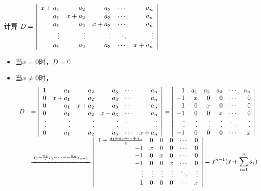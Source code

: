 \begin{frame}
  
    \begin{li}
      计算
      $
      D=\left|
      \begin{array}{rrrrr}
        x+a_1&a_2&a_3&\cdots&a_n\\
        a_1&x+a_2&a_3&\cdots&a_n\\
        a_1&a_2&x+a_3&\cdots&a_n\\
        \vdots&\vdots&\vdots&\ddots&\vdots\\
        a_1&a_2&a_3&\cdots&x+a_n
      \end{array}
      \right|
      $
    \end{li}
    

    \pause
    \begin{small}
    \begin{jie}[加边法]
    \begin{itemize}
    \item 当$x=0$时，$D=0$
    \item 当$x\ne 0$时，
      $$
    \begin{array}{rl}
            D&=\left|
      \begin{array}{rrrrrr}
        1&a_1&a_2&a_3&\cd&a_n\\
        0&x+a_1&a_2&a_3&\cd&a_n\\
        0&a_1&x+a_2&a_3&\cd&a_n\\
        0&a_1&a_2&x+a_3&\cd&a_n\\
        \vd&\vd&\vd&\vd&\dd&\vd\\
        0&a_1&a_2&a_3&\cd&x+a_n
      \end{array}      \right|=\left|
      \begin{array}{rrrrrr}
        1&a_1&a_2&a_3&\cd&a_n\\
        -1&x&0&0&\cd&0\\
        -1&0&x&0&\cd&0\\
        -1&0&0&x&\cd&0\\
        \vd&\vd&\vd&\vd&\dd&\vd\\
        -1&0&0&0&\cd&x
      \end{array}
      \right|\\[0.4in]
      &\xlongequal[]{r_1-\frac{a_1}xr_2-\cd--\frac{a_n}xr_{n+1}}
      \left|
      \begin{array}{rrrrrr}
        1+\frac{a_1+a_2+\cd+a_n}x&0&0&0&\cd&0\\
        -1&x&0&0&\cd&0\\
        -1&0&x&0&\cd&0\\
        -1&0&0&x&\cd&0\\
        \vd&\vd&\vd&\vd&\dd&\vd\\
        -1&0&0&0&\cd&x
      \end{array}
      \right|=\ds x^{n-1}(x+\sum_{i=1}^na_i)
    \end{array}
      $$
    \end{itemize}
  \end{jie}
  \end{small}
\end{frame}


